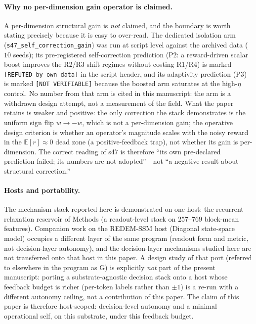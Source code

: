 \documentclass[preprint,12pt]{elsarticle}
\begin{document}
\paragraph{Why no per-dimension gain operator is claimed.}
\begin{sloppypar}
A per-dimension structural gain is \emph{not} claimed, and the boundary is
worth stating precisely because it is easy to over-read. The dedicated
isolation arm (\texttt{s47\_self\_correction\_gain}) was run at script level
against the archived data ($10$ seeds); its pre-registered self-correction
prediction (P2: a reward-driven scalar boost improves the R2/R3 shift
regimes without costing R1/R4) is marked \texttt{[REFUTED by own data]} in
the script header, and its adaptivity prediction (P3) is marked
\texttt{[NOT VERIFIABLE]} because the boosted arm saturates at the high-$\eta$
control. No number from that arm is cited in this manuscript: the arm is a
withdrawn design attempt, not a measurement of the field. What the paper
retains is weaker and positive: the only correction the stack demonstrates
is the uniform sign flip $w\to-w$, which is not a per-dimension gain; the
operative design criterion is whether an operator's magnitude scales with the
noisy reward in the $\mathbb E[r]\approx0$ dead zone (a positive-feedback
trap), not whether its gain is per-dimension. The correct reading of s47 is
therefore ``its own pre-declared prediction failed; its numbers are not
adopted''---not ``a negative result about structural correction.''
\end{sloppypar}

\paragraph{Hosts and portability.}
The mechanism stack reported here is demonstrated on one host: the
recurrent relaxation reservoir of Methods (a readout-level stack on
$257$--$769$ block-mean features). Companion work on the REDEM-SSM host
(Diagonal state-space model) occupies a different layer of the same program
(readout form and metric, not decision-layer autonomy), and the decision-layer
mechanisms studied here are not transferred onto that host in this paper. A
design study of that port (referred to elsewhere in the program as G) is
explicitly \emph{not} part of the present manuscript: porting a
substrate-agnostic decision stack onto a host whose feedback budget is
richer (per-token labels rather than $\pm1$) is a re-run with a different
autonomy ceiling, not a contribution of this paper. The claim of this paper
is therefore host-scoped: decision-level autonomy and a minimal operational
self, on this substrate, under this feedback budget.
\end{document}
